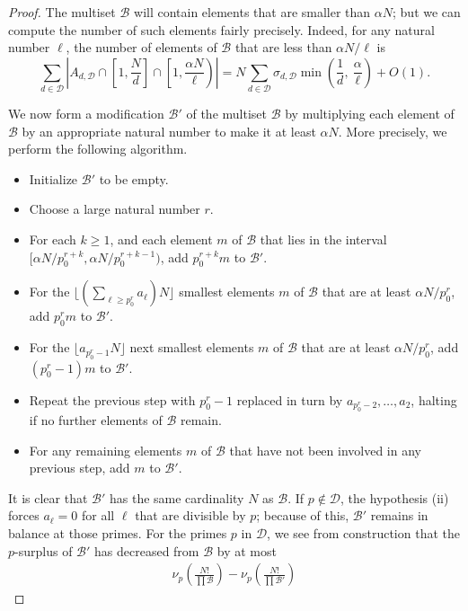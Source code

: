 \documentclass[12pt,a4paper,reqno]{amsart}
\numberwithin{equation}{section}
\theoremstyle{plain}
\theoremstyle{definition}
\newcommand\tuple{{\mathcal B}}
\begin{document}
\begin{proof}
The multiset $\tuple$ will contain elements that are smaller than $\alpha N$; but we can compute the number of such elements fairly precisely.  Indeed, for any natural number $\ell$, the number of elements of $\tuple$ that are less than $\alpha N/\ell$ is
\begin{equation}\label{N-sum}
  \sum_{d \in {\mathcal D}} \left|A_{d,{\mathcal D}} \cap \left[1,\frac{N}{d}\right] \cap \left[1,\frac{\alpha N}{\ell}\right)\right| = N \sum_{d \in {\mathcal D}} \sigma_{d,{\mathcal D}} \min\left(\frac{1}{d}, \
  \frac{\alpha}{\ell}\right) + O(1).
\end{equation}
  
We now form a modification $\tuple'$ of the multiset $\tuple$ by multiplying each element of $\tuple$ by an appropriate natural number to make it at least $\alpha N$.  More precisely, we perform the following algorithm.
\begin{itemize}
  \item Initialize $\tuple'$ to be empty.
  \item Choose a large natural number $r$.
  \item For each $k \geq 1$, and each element $m$ of $\tuple$ that lies in the interval $[\alpha N/p_0^{r+k}, \alpha N/p_0^{r+k-1})$, add $p_0^{r+k} m$ to $\tuple'$.
  \item For the $\lfloor (\sum_{\ell \geq p_0^r} a_\ell) N \rfloor$ smallest elements $m$ of $\tuple$ that are at least $\alpha N/p_0^r$, add $p_0^r m$ to $\tuple'$.
  \item For the $\lfloor a_{p_0^r-1} N \rfloor$ next smallest elements $m$ of $\tuple$ that are at least $\alpha N/p_0^r$, add $(p_0^r-1)m$ to $\tuple'$.
  \item Repeat the previous step with $p_0^r-1$ replaced in turn by $a_{p_0^r-2}, \dots, a_2$, halting if no further elements of $\tuple$ remain.
  \item For any remaining elements $m$ of $\tuple$ that have not been involved in any previous step, add $m$ to $\tuple'$. 
\end{itemize}
It is clear that $\tuple'$ has the same cardinality $N$ as $\tuple$.  If $p \not \in {\mathcal D}$, the hypothesis (ii) forces $a_\ell=0$ for all $\ell$ that are divisible by $p$; because of this, $\tuple'$ remains in balance at those primes.  For the primes $p$ in ${\mathcal D}$, we see from construction that the $p$-surplus of $\tuple'$ has decreased from $\tuple$ by at most
\begin{align*}
  \nu_p\left( \frac{N!}{\prod \tuple} \right)  -  \nu_p\left( \frac{N!}{\prod \tuple'} \right)

\end{align*}
\end{proof}
\end{document}
